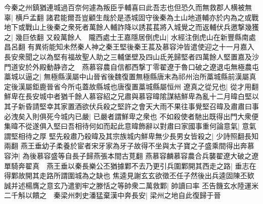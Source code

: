 今秦之州鎮猶連城過百奈何遽為叛臣乎輔喜曰此吾志也但恐久而無救郡人横被無辜|{
	横戶孟翻}
諸君能爾吾豈顧生哉於是憑城固守後秦為土山地道輔亦於内為之或戰地下或戰山上後秦之衆死者萬餘人輔詐降以誘萇萇將入城覺之而返輔伏兵邀撃幾獲之|{
	幾巨依翻}
又殺萬餘人　隴西處士王嘉隱居倒虎山|{
	水經注倒虎山在新豐縣南處昌呂翻}
有異術能知未然秦人神之秦王堅後秦王萇及慕容沖皆遣使迎之十一月嘉入長安衆聞之以為堅有福故聖人助之三輔堡壁及四山氐羌歸堅者四萬餘人堅置嘉及沙門道安於外殿動静咨之　燕慕容農自信都西撃丁零翟遼于魯口破之遼退屯無極農屯藁城以逼之|{
	無極縣漢屬中山晉省後魏復置無極縣唐末為祁州治所藁城縣前漢屬真定後漢屬鉅鹿晉省今所屯蓋故縣城也唐復置藁城縣屬恒州}
遼真之從兄也|{
	從才用翻}
鮮卑在長安城中者猶千餘人慕容紹之兄肅與慕容暐隂謀結鮮卑為亂十二月暐白堅以其子新昏請堅幸其家置酒欲伏兵殺之堅許之會天大雨不果往事覺堅召暐及肅肅曰事必洩矣入則俱死今城内已嚴|{
	已嚴者謂鮮卑之衆也}
不如殺使者馳出既得出門大衆便集暐不從遂俱入堅曰吾相待何如而起此意暐飾辭以對肅曰家國事重何論意氣|{
	意氣謂堅相待之厚}
堅先殺肅乃殺暐及其宗族城内鮮卑無少長男女皆殺之|{
	少詩照翻長知兩翻}
燕王垂幼子柔養於宦者宋牙家為牙子故得不坐與太子寶之子盛乘間得出奔慕容沖|{
	為後慕容盛等自長子歸燕張本間古莧翻}
燕慕容麟慕容農合兵襲翟遼大破之遼單騎奔翟真　燕王垂以秦長樂公丕猶據鄴不去乃更引兵圍鄴開其西走之路|{
	垂志在得鄴故開其走路所謂圍城為之缺也}
焦逵見謝玄玄欲徵丕任子然後出兵逵固陳丕欵誠并述楊膺之意玄乃遣劉牢之滕恬之等帥衆二萬救鄴|{
	帥讀曰率}
丕告饑玄水陸運米二千斛以饋之　秦梁州刺史潘猛棄漢中奔長安|{
	梁州之地自此復歸于晉}


